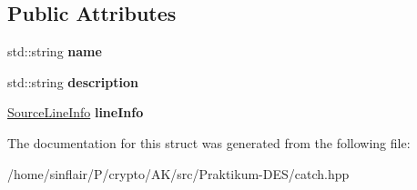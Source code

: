 \subsection*{Public Attributes}
\begin{DoxyCompactItemize}
\item 
\mbox{\label{structCatch_1_1SectionInfo_a704c8fc662d309137e0d4f199cb7df58}} 
std\+::string {\bfseries name}
\item 
\mbox{\label{structCatch_1_1SectionInfo_a0052060219a6de74bb7ade34d4163a4e}} 
std\+::string {\bfseries description}
\item 
\mbox{\label{structCatch_1_1SectionInfo_adbc83b8a3507c4acc8ee249e93465711}} 
\hyperlink{structCatch_1_1SourceLineInfo}{Source\+Line\+Info} {\bfseries line\+Info}
\end{DoxyCompactItemize}


The documentation for this struct was generated from the following file\+:\begin{DoxyCompactItemize}
\item 
/home/sinflair/\+P/crypto/\+A\+K/src/\+Praktikum-\/\+D\+E\+S/catch.\+hpp\end{DoxyCompactItemize}
